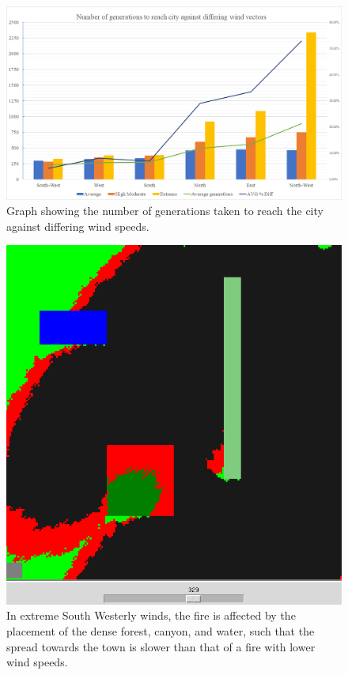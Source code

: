 \documentclass[11pt, a4paper, titlepage]{article}
\begin{document}
    
    \begin{figure}[H]
      \centering
        \includegraphics[width=\linewidth]{imgs/graphs/wind.png}
      \caption{Graph showing the number of generations taken to reach the city against differing wind speeds.}
      \label{}
    \end{figure}

  



    \begin{figure}[H]
      \centering
      \includegraphics[width=0.75\linewidth]{imgs/wind/x-15y15_gen329}
      \caption{In extreme South Westerly winds, the fire is affected by the placement of the dense forest, canyon, and water, such that the spread towards the town is slower than that of a fire with lower wind speeds.}
      \label{}
    \end{figure}
\end{document}

